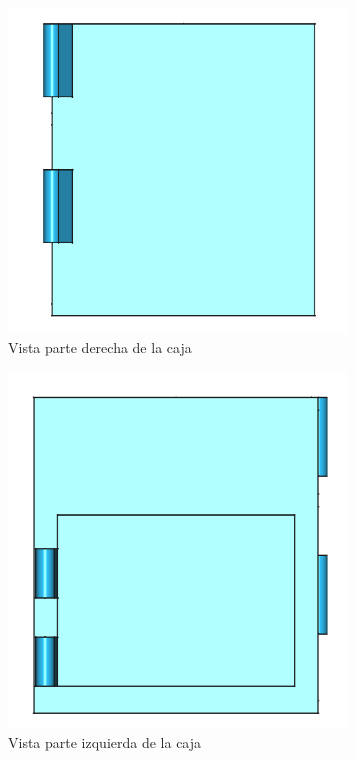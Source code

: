 \begin{figure}[H]
	\centering
	\includegraphics[width=0.8\textwidth]{images/4-DesarrolloTeorico/4-1-caja/CAJA_3D_DER.png}
	\caption{Vista parte derecha de la caja}
\end{figure}

\begin{figure}[H]
	\centering
	\includegraphics[width=0.8\textwidth]{images/4-DesarrolloTeorico/4-1-caja/CAJA_3D_IZQ.png}
	\caption{Vista parte izquierda de la caja}
\end{figure}

